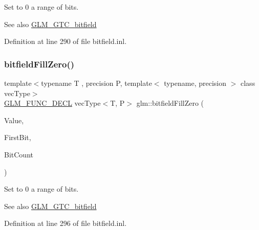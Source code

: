 Set to 0 a range of bits.

\begin{DoxySeeAlso}{See also}
\mbox{\hyperlink{group__gtc__bitfield}{G\+L\+M\+\_\+\+G\+T\+C\+\_\+bitfield}} 
\end{DoxySeeAlso}


Definition at line 290 of file bitfield.\+inl.

\mbox{\label{group__gtc__bitfield_gaddba3196316b0bd240295b09b43c2958}} 
\subsubsection{\texorpdfstring{bitfieldFillZero()}{bitfieldFillZero()}\hspace{0.1cm}{\footnotesize\ttfamily [2/2]}}
{\footnotesize\ttfamily template$<$typename T , precision P, template$<$ typename, precision $>$ class vec\+Type$>$ \\
\mbox{\hyperlink{setup_8hpp_ab2d052de21a70539923e9bcbf6e83a51}{G\+L\+M\+\_\+\+F\+U\+N\+C\+\_\+\+D\+E\+CL}} vec\+Type$<$T, P$>$ glm\+::bitfield\+Fill\+Zero (\begin{DoxyParamCaption}\item[{vec\+Type$<$ T, P $>$ const \&}]{Value,  }\item[{int}]{First\+Bit,  }\item[{int}]{Bit\+Count }\end{DoxyParamCaption})}

Set to 0 a range of bits.

\begin{DoxySeeAlso}{See also}
\mbox{\hyperlink{group__gtc__bitfield}{G\+L\+M\+\_\+\+G\+T\+C\+\_\+bitfield}} 
\end{DoxySeeAlso}


Definition at line 296 of file bitfield.\+inl.

\mbox{\label{group__gtc__bitfield_ga479134317bc95d99f2b2e235d3db287b}} 
